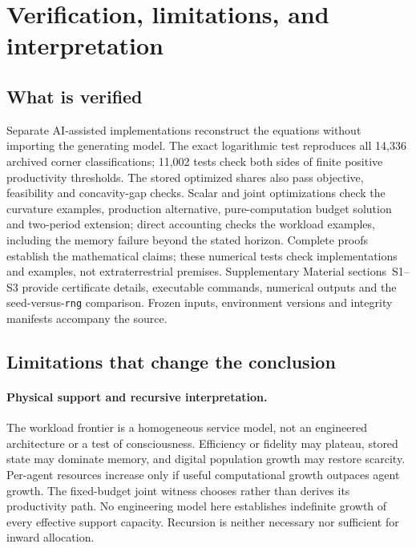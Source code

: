 \documentclass[11pt,a4paper]{article}
\theoremstyle{definition}\newtheorem{definition}{Definition}
\begin{document}
\section{Verification, limitations, and interpretation}
\label{sec:verification}
\subsection{What is verified}
Separate AI-assisted implementations reconstruct the equations without
importing the generating model. The exact logarithmic test reproduces
all 14,336 archived corner classifications; 11,002 tests check both sides
of finite positive productivity thresholds. The stored optimized shares
also pass objective, feasibility and concavity-gap checks. Scalar and
joint optimizations check the curvature examples, production alternative,
pure-computation budget solution and two-period extension; direct
accounting checks the workload examples, including the memory failure
beyond the stated horizon. Complete proofs establish the mathematical
claims; these numerical tests check implementations and examples, not
extraterrestrial premises. Supplementary Material sections~S1--S3 provide
certificate details, executable commands, numerical outputs and the
seed-versus-\texttt{rng} comparison. Frozen inputs, environment versions
and integrity manifests accompany the source.

\subsection{Limitations that change the conclusion}
\label{sec:limitations}
\paragraph{Physical support and recursive interpretation.}
The workload frontier is a homogeneous service model, not an engineered
architecture or a test of consciousness. Efficiency or fidelity may
plateau, stored state may dominate memory, and digital population growth
may restore scarcity. Per-agent resources increase only if useful
computational growth outpaces agent growth. The fixed-budget joint witness
chooses rather than derives its productivity path. No engineering model
here establishes indefinite growth of every effective support capacity.
Recursion is neither necessary nor sufficient for inward allocation.
\end{document}
